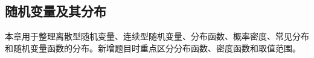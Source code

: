 \subsection{随机变量及其分布}

\begin{knowledgeBox}
本章用于整理离散型随机变量、连续型随机变量、分布函数、概率密度、常见分布和随机变量函数的分布。新增题目时重点区分分布函数、密度函数和取值范围。
\end{knowledgeBox}
